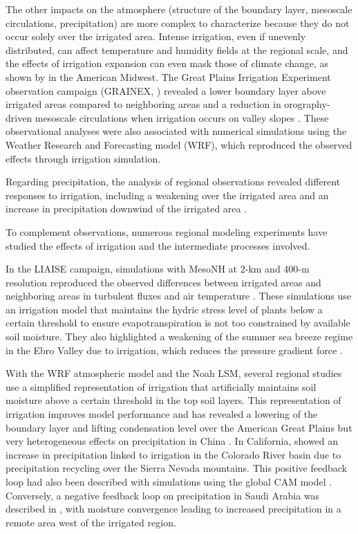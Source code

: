 The other impacts on the atmosphere (structure of the boundary layer, mesoscale circulations, precipitation) are more complex to characterize because they do not occur solely over the irrigated area. Intense irrigation, even if unevenly distributed, can affect temperature and humidity fields at the regional scale, and the effects of irrigation expansion can even mask those of climate change, as shown by \cite{nocco_observation_2019} in the American Midwest. The Great Plains Irrigation Experiment observation campaign (GRAINEX, \cite{rappin_great_2021}) revealed a lower boundary layer above irrigated areas compared to neighboring areas \cite{rappin_landatmosphere_2022} and a reduction in orography-driven mesoscale circulations when irrigation occurs on valley slopes \cite{phillips_influence_2022}. These observational analyses were also associated with numerical simulations using the Weather Research and Forecasting model (WRF), which reproduced the observed effects through irrigation simulation.

Regarding precipitation, the analysis of regional observations revealed different responses to irrigation, including a weakening over the irrigated area \citep{alter_rainfall_2015} and an increase in precipitation downwind of the irrigated area \cite{deangelis_evidence_2010}.

To complement observations, numerous regional modeling experiments have studied the effects of irrigation and the intermediate processes involved.

In the LIAISE campaign, simulations with MesoNH at 2-km and 400-m resolution reproduced the observed differences between irrigated areas and neighboring areas in turbulent fluxes and air temperature \citep{lunel_irrigation_2024}. These simulations use an irrigation model that maintains the hydric stress level of plants below a certain threshold to ensure evapotranspiration is not too constrained by available soil moisture. They also highlighted a weakening of the summer sea breeze regime in the Ebro Valley due to irrigation, which reduces the pressure gradient force \citep{lunel_marinada_2024}.

With the WRF atmospheric model and the Noah LSM, several regional studies use a simplified representation of irrigation that artificially maintains soil moisture above a certain threshold in the top soil layers. This representation of irrigation improves model performance and has revealed a lowering of the boundary layer and lifting condensation level over the American Great Plains \citep{qian_modeling_2013} but very heterogeneous effects on precipitation in China \citep{liu_simulating_2021}. In California, \cite{yang_impact_2017} showed an increase in precipitation linked to irrigation in the Colorado River basin due to precipitation recycling over the Sierra Nevada mountains. This positive feedback loop had also been described with simulations using the global CAM model \citep{lo_irrigation_2013}. Conversely, a negative feedback loop on precipitation in Saudi Arabia was described in \citep{lo_intense_2021}, with moisture convergence leading to increased precipitation in a remote area west of the irrigated region.

